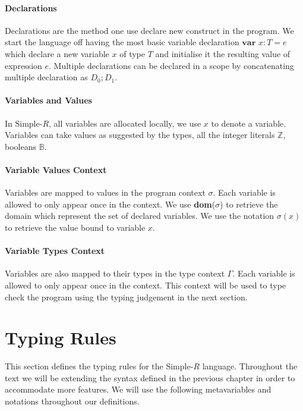 \documentclass[a4paper,12pt]{report}
\begin{document}
\paragraph{Declarations} Declarations are the method one use declare new construct 
in the program. We start the language off having the most basic variable declaration 
$\textbf{var }x : T = e$ which declare a new variable $x$ of type $T$ and 
initialise it the resulting value of expression $e$. Multiple declarations can 
be declared in a scope by concatenating multiple declaration as $D_0;D_1$.

\paragraph{Variables and Values} In Simple-$R$, all variables are allocated 
locally, we use $x$ to denote a variable. Variables can take values as suggested by the types, all the integer 
literals $\mathbb{Z}$, booleans $\mathbb{B}$.

\paragraph{Variable Values Context} Variables are mapped to values in the program 
context $\sigma$. Each variable is allowed to only appear once in 
the context. We use \textbf{dom}($\sigma$) to retrieve the domain which represent 
the set of declared variables. We use the notation $\sigma(x)$ 
to retrieve the value bound to variable $x$.

\paragraph{Variable Types Context} Variables are also mapped to their types 
in the type context $\Gamma$. Each variable is allowed to only appear once in 
the context. This context will be used to type check the program using the 
typing judgement in the next section.

\section{Typing Rules}
This section defines the typing rules for the Simple-$R$ language. 
Throughout the text we will be extending the syntax defined in the 
previous chapter in order to accommodate more features. 
We will use the following metavariables and notations throughout our 
definitions.
\end{document}
